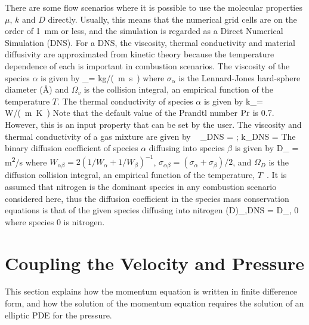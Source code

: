 There are some flow scenarios where it is possible to use the molecular properties
$\mu$, $k$ and $D$ directly. Usually, this means that the numerical grid cells are on the
order of 1~mm or less, and the simulation is regarded as a
Direct Numerical Simulation (DNS).
For a DNS, the viscosity, thermal conductivity
and material diffusivity are approximated from kinetic theory because the temperature
dependence of each is important in combustion scenarios.
The viscosity of the species $\alpha$ is given by
\be \mu_\alpha = 
\quad [=] \quad \si{kg/(m.s)} \ee
where $\sigma_\alpha$ is the Lennard-Jones
hard-sphere diameter ($\text{\AA}$) and $\Omega_v$ is the
collision integral, an empirical function of the
temperature $T$. The thermal conductivity of species $\alpha$ is given by
\be k_\alpha =   \quad [=] \quad \si{W/(m.K)} \ee
Note that the default value of the Prandtl number $\hbox{Pr}$ is 0.7.  However, this is an input property that can be set by the user.
The viscosity and thermal conductivity of a gas mixture are given by  ~\cite{Davidson:1993}
\be \mu_{\hbox{\tiny DNS}} =   \quad ; \quad k_{\hbox{\tiny DNS}} =   \ee
The binary diffusion coefficient of species $\alpha$
diffusing into species $\beta$ is given by
\be D_{\alpha \beta} = 
\quad [=] \quad \si{m^2/s} \ee
where $W_{\alpha \beta}=2(1/W_\alpha+1/W_\beta)^{-1}$, $\sigma_{\alpha \beta}=(\sigma_\alpha+\sigma_\beta)/2$, and
$\Omega_D$ is the diffusion collision integral, an empirical
function of the temperature, $T$~\cite{Poling:1}.
It is assumed that nitrogen is the dominant species in any combustion
scenario considered here, thus the diffusion coefficient in the
species mass conservation equations is that of the given species diffusing
into nitrogen
\be (\rho D)_{\alpha,\hbox{\tiny DNS}} = \rho \;  D_{\alpha, 0} \ee
where species 0 is nitrogen.

\newpage

\section{Coupling the Velocity and Pressure}

This section explains how the momentum equation is written in finite difference form, and how the solution of the momentum equation requires the solution of an elliptic PDE for the pressure.

